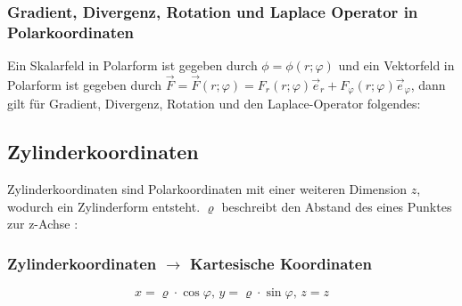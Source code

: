 \documentclass[a4paper,10pt]{scrartcl}
\begin{document}
        \subsubsection{Gradient, Divergenz, Rotation und Laplace Operator in Polarkoordinaten}
        Ein Skalarfeld in Polarform ist gegeben durch \(\phi = \phi(r; \varphi)\) und ein Vektorfeld in Polarform ist gegeben durch \(\vec{F} =
        \vec{F}(r;\varphi) = F_r(r;\varphi)\vec{e}_r + F_{\varphi} (r;\varphi)\vec{e}_{\varphi}\), dann gilt für Gradient, Divergenz, Rotation und 
        den Laplace-Operator folgendes: 
        \subsection{Zylinderkoordinaten}
            Zylinderkoordinaten sind Polarkoordinaten mit einer weiteren Dimension \(z\), wodurch ein Zylinderform entsteht. \(\varrho\) beschreibt den Abstand des eines Punktes zur z-Achse :
            \subsubsection*{Zylinderkoordinaten \(\rightarrow\) Kartesische Koordinaten}
                \begin{equation*}
                    x = \varrho \cdot \cos \varphi \text{, } y = \varrho \cdot \sin \varphi \text{, } z = z
                \end{equation*}
\end{document}
